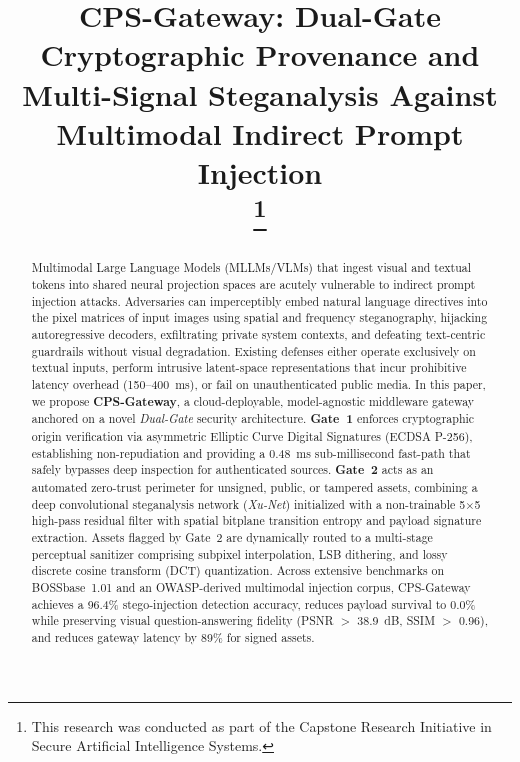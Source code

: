 \documentclass[conference]{IEEEtran}
\begin{document}
\title{\LARGE\bfseries CPS-Gateway: Dual-Gate Cryptographic Provenance and Multi-Signal Steganalysis Against Multimodal Indirect Prompt Injection\\
\thanks{This research was conducted as part of the Capstone Research Initiative in Secure Artificial Intelligence Systems.}
}

\author{
}

\maketitle
\thispagestyle{plain}
\pagestyle{plain}

\begin{abstract}
Multimodal Large Language Models (MLLMs/VLMs) that ingest visual and textual tokens into shared neural projection spaces are acutely vulnerable to indirect prompt injection attacks. Adversaries can imperceptibly embed natural language directives into the pixel matrices of input images using spatial and frequency steganography, hijacking autoregressive decoders, exfiltrating private system contexts, and defeating text-centric guardrails without visual degradation. Existing defenses either operate exclusively on textual inputs, perform intrusive latent-space representations that incur prohibitive latency overhead (150--400~ms), or fail on unauthenticated public media. In this paper, we propose \textbf{CPS-Gateway}, a cloud-deployable, model-agnostic middleware gateway anchored on a novel \textit{Dual-Gate} security architecture. \textbf{Gate~1} enforces cryptographic origin verification via asymmetric Elliptic Curve Digital Signatures (ECDSA P-256), establishing non-repudiation and providing a 0.48~ms sub-millisecond fast-path that safely bypasses deep inspection for authenticated sources. \textbf{Gate~2} acts as an automated zero-trust perimeter for unsigned, public, or tampered assets, combining a deep convolutional steganalysis network (\textit{Xu-Net}) initialized with a non-trainable 5$\times$5 high-pass residual filter with spatial bitplane transition entropy and payload signature extraction. Assets flagged by Gate~2 are dynamically routed to a multi-stage perceptual sanitizer comprising subpixel interpolation, LSB dithering, and lossy discrete cosine transform (DCT) quantization. Across extensive benchmarks on BOSSbase~1.01 and an OWASP-derived multimodal injection corpus, CPS-Gateway achieves a 96.4\% stego-injection detection accuracy, reduces payload survival to 0.0\% while preserving visual question-answering fidelity (PSNR $>$ 38.9~dB, SSIM $>$ 0.96), and reduces gateway latency by 89\% for signed assets.
\end{abstract}
\end{document}
